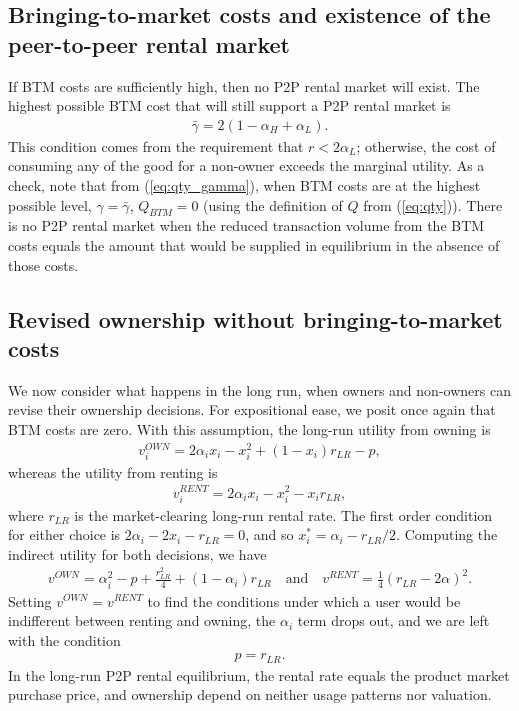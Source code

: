 \documentclass[12pt]{article}
\begin{document}
\subsection{Bringing-to-market costs and existence of the peer-to-peer rental market}
If BTM costs are sufficiently high, then no P2P rental market will exist. 
The highest possible BTM cost that will still support a P2P rental market is 
\begin{align} 
  \bar{\gamma} = 2(1-\alpha_H + \alpha_L). 
\end{align}
This condition comes from the requirement that  $r < 2 \alpha_L$; otherwise, the cost of consuming any of the good for a non-owner exceeds the marginal utility. 
As a check, note that from (\ref{eq:qty_gamma}), when BTM costs are at the highest possible level, $\gamma = \bar{\gamma}$, $Q_{BTM} = 0$ (using the definition of $Q$ from (\ref{eq:qty})).
There is no P2P rental market when the reduced transaction volume from the BTM costs equals the amount that would be supplied in equilibrium in the absence of those costs. 

\subsection{Revised ownership without bringing-to-market costs}
We now consider what happens in the long run, when owners and non-owners can revise their ownership decisions.
For expositional ease, we posit once again that BTM costs are zero. 
With this assumption, the long-run utility from owning is 
\begin{align}
v^{OWN}_i = 2\alpha_i x_i - x_i^2 + (1-x_i)r_{LR} - p,   
\end{align} 
whereas the utility from renting is 
\begin{align}
v^{RENT}_{i} = 2\alpha_i x_i - x_i^2 - x_i r_{LR}, 
\end{align} 
where $r_{LR}$ is the market-clearing long-run rental rate. 
The first order condition for either choice is $2 \alpha_i - 2 x_i - r_{LR} = 0$, and so $x^*_i = \alpha_i - r_{LR}/2$. 
Computing the indirect utility for both decisions, we have
\begin{align} 
v^{OWN} = \alpha_i^2 - p + \frac{r_{LR}^2}{4} + (1 - \alpha_i) r_{LR} \quad  \mbox{and} \quad v^{RENT} = \frac{1}{4} (r_{LR}- 2\alpha )^2. 
\end{align} 
Setting $v^{OWN} = v^{RENT}$ to find the conditions under which a user would be indifferent between renting and owning, the $\alpha_i$ term drops out, and we are left with the condition 
\begin{align} \label{eq:lr_eq_r}
p = r_{LR}. 
\end{align}
In the long-run P2P rental equilibrium, the rental rate equals the product market purchase price, and ownership depend on neither usage patterns nor valuation.  
\end{document}
